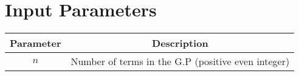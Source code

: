 \documentclass{article}
\begin{document}
\section*{Input Parameters}
\begin{center}
\begin{tabular}{|c|c|}
\hline
Parameter & Description \\
\hline
\( n \) & Number of terms in the G.P (positive even integer) \\
\hline
\end{tabular}
\end{center}
\end{document}

